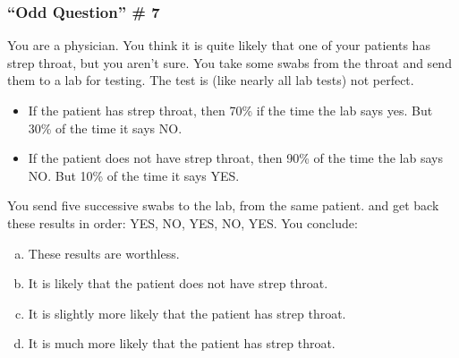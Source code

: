 \documentclass{beamer}
\begin{document}
\begin{singlespace}
\begin{frame}
\frametitle{``Odd Question'' \# 7}
	\small
	You are a physician. You think it is quite likely that one of your patients has strep throat, but you 
	aren't sure. You take some swabs from the throat and send them to a lab for testing. The test is 
	(like nearly all lab tests) not perfect. 
	\begin{itemize}
		\item If the patient has strep throat, then 70\% if the time the lab says yes. But 30\% of the 
		time it says NO.
		\item If the patient does not have strep throat, then 90\% of the time the lab says NO. But 
		10\% of the time it says YES.
	\end{itemize}
	You send five successive swabs to the lab, from the same patient. and get back these results in 
	order: YES, NO, YES, NO, YES. You conclude:
	\begin{enumerate}[(a)]
		\item These results are worthless.
		\item It is likely that the patient does not have strep throat.
		\item It is slightly more likely that the patient has strep throat.
		\item It is  much more likely that the patient has strep throat.
	\end{enumerate}
\end{frame}

\end{singlespace}
\end{document}
